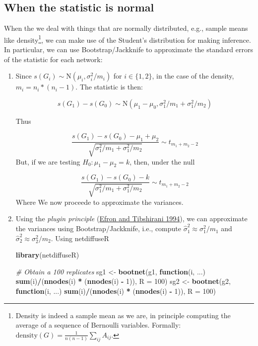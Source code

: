 \documentclass[
]{book}
\newenvironment{Shaded}{\begin{snugshade}}{\end{snugshade}}
\newcommand{\AttributeTok}[1]{\textcolor[rgb]{0.13,0.29,0.53}{#1}}
\newcommand{\CommentTok}[1]{\textcolor[rgb]{0.56,0.35,0.01}{\textit{#1}}}
\newcommand{\ControlFlowTok}[1]{\textcolor[rgb]{0.13,0.29,0.53}{\textbf{#1}}}
\newcommand{\DecValTok}[1]{\textcolor[rgb]{0.00,0.00,0.81}{#1}}
\newcommand{\FunctionTok}[1]{\textcolor[rgb]{0.13,0.29,0.53}{\textbf{#1}}}
\newcommand{\NormalTok}[1]{#1}
\newcommand{\OtherTok}[1]{\textcolor[rgb]{0.56,0.35,0.01}{#1}}
\newcommand{\SpecialCharTok}[1]{\textcolor[rgb]{0.81,0.36,0.00}{\textbf{#1}}}
\begin{document}
\hypertarget{when-the-statistic-is-normal}{%
\subsection{When the statistic is normal}\label{when-the-statistic-is-normal}}

When the we deal with things that are normally distributed, e.g., sample means
like density\footnote{Density is indeed a sample mean as we are, in principle
  computing the average of a sequence of Bernoulli variables. Formally:
  \(\mbox{density}(G) = \frac{1}{n(n-1)}\sum_{ij}A_{ij}\).},
we can make use of the Student's distribution for making inference. In particular,
we can use Bootstrap/Jackknife to approximate the standard errors of the statistic
for each network:

\begin{enumerate}
\def\labelenumi{\arabic{enumi}.}
\item
  Since \(s(G_i)\sim \mbox{N}(\mu_i,\sigma_i^2/m_i)\) for \(i\in\{1,2\}\), in the case
  of the density, \(m_i = n_i * (n_i - 1)\). The statistic is then:

  \[
  s(G_1) - s(G_0)\sim \mbox{N}(\mu_1-\mu_0, \sigma_1^2/m_1 + \sigma_1^2/m_2)
  \]

  Thus

  \[
  \frac{s(G_1) - s(G_0) - \mu_1 + \mu_2}{\sqrt{\sigma_1^2/{m_1} + \sigma_1^2/{m_2}}} \sim t_{m_1 + m_2 - 2}
  \]
  But, if we are testing \(H_0: \mu_1 - \mu_2 = k\), then, under the null

  \[
  \frac{s(G_1) - s(G_0) - k}{\sqrt{\sigma_1^2/{m_1} + \sigma_1^2/{m_2}}} \sim t_{m_1 + m_2 - 2}
  \]
  Where We now proceede to approximate the variances.
\item
  Using the \emph{plugin principle} (\protect\hyperlink{ref-Efron1994}{Efron and Tibshirani 1994}), we can approximate the variances
  using Bootstrap/Jackknife, i.e., compute \(\hat\sigma_1^2\approx\sigma_1^2/m_1\) and
  \(\hat\sigma_2^2\approx\sigma_2^2/m_2\). Using netdiffuseR

\begin{Shaded}
\begin{Highlighting}[]
\FunctionTok{library}\NormalTok{(netdiffuseR)}

\CommentTok{\# Obtain a 100 replicates}
\NormalTok{sg1 }\OtherTok{\textless{}{-}} \FunctionTok{bootnet}\NormalTok{(g1, }\ControlFlowTok{function}\NormalTok{(i, ...) }\FunctionTok{sum}\NormalTok{(i)}\SpecialCharTok{/}\NormalTok{(}\FunctionTok{nnodes}\NormalTok{(i) }\SpecialCharTok{*}\NormalTok{ (}\FunctionTok{nnodes}\NormalTok{(i) }\SpecialCharTok{{-}} \DecValTok{1}\NormalTok{)), }\AttributeTok{R =} \DecValTok{100}\NormalTok{)}
\NormalTok{sg2 }\OtherTok{\textless{}{-}} \FunctionTok{bootnet}\NormalTok{(g2, }\ControlFlowTok{function}\NormalTok{(i, ...) }\FunctionTok{sum}\NormalTok{(i)}\SpecialCharTok{/}\NormalTok{(}\FunctionTok{nnodes}\NormalTok{(i) }\SpecialCharTok{*}\NormalTok{ (}\FunctionTok{nnodes}\NormalTok{(i) }\SpecialCharTok{{-}} \DecValTok{1}\NormalTok{)), }\AttributeTok{R =} \DecValTok{100}\NormalTok{)}


\end{Highlighting}
\end{Shaded}
\end{enumerate}
\end{document}
